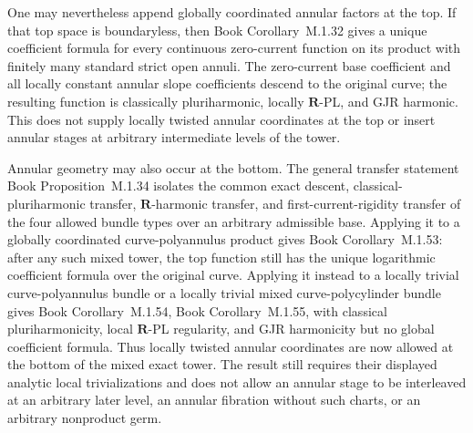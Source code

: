 \documentclass[11pt,a4paper]{article}
\theoremstyle{definition}
\theoremstyle{remark}
\begin{document}
One may nevertheless append globally coordinated annular factors at the
top.  If that top space is boundaryless, then
Book Corollary~M.1.32 gives a unique
coefficient formula for every continuous zero-current function on its
product with finitely many standard strict open annuli.  The zero-current
base coefficient and all locally constant annular slope coefficients
descend to the original curve; the resulting function is classically
pluriharmonic, locally \(\mathbf R\)-PL, and GJR harmonic.  This does not
supply locally twisted annular coordinates at the top or insert annular
stages at arbitrary intermediate levels of the tower.

Annular geometry may also occur at the bottom.  The general transfer
statement Book Proposition~M.1.34 isolates the
common exact descent, classical-pluriharmonic transfer,
\(\mathbf R\)-harmonic transfer, and first-current-rigidity transfer of the
four allowed bundle types over an arbitrary admissible base.  Applying it
to a globally coordinated curve-polyannulus product gives
Book Corollary~M.1.53: after any such mixed
tower, the top function still has the unique logarithmic coefficient formula
over the original curve.  Applying it instead to a locally trivial
curve-polyannulus bundle or a locally trivial mixed curve-polycylinder bundle
gives
Book Corollary~M.1.54, Book Corollary~M.1.55,
with classical pluriharmonicity, local \(\mathbf R\)-PL regularity, and GJR
harmonicity but no global coefficient formula.  Thus locally twisted
annular coordinates are now allowed at the bottom of the mixed exact tower.
The result still requires their displayed analytic local trivializations and
does not allow an annular stage to be interleaved at an arbitrary later
level, an annular fibration without such charts, or an arbitrary nonproduct
germ.
\end{document}
